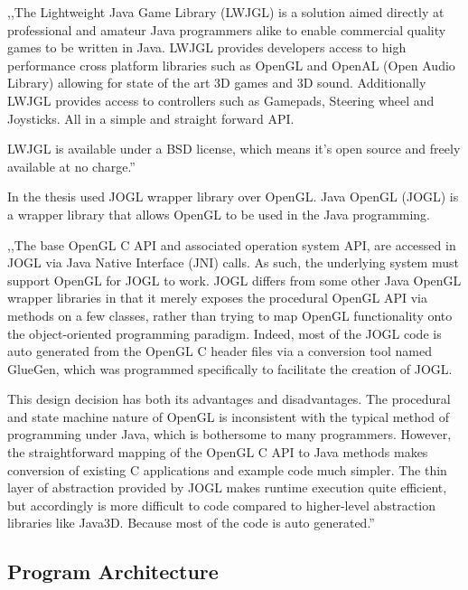 ,,The Lightweight Java Game Library (LWJGL) is a solution aimed directly at professional and amateur Java programmers alike to enable commercial quality games to be written in Java. LWJGL provides developers access to high performance cross platform libraries such as OpenGL and OpenAL (Open Audio Library) allowing for state of the art 3D games and 3D sound. Additionally LWJGL provides access to controllers such as Gamepads, Steering wheel and Joysticks. All in a simple and straight forward API.

LWJGL is available under a BSD license, which means it's open source and freely available at no charge.''~\cite{LWJGL}


In the thesis used JOGL wrapper library over OpenGL. Java OpenGL (JOGL) is a wrapper library that allows OpenGL to be used in the Java programming.


,,The base OpenGL C API and associated operation system API, are accessed in JOGL via Java Native Interface (JNI) calls. As such, the underlying system must support OpenGL for JOGL to work. JOGL differs from some other Java OpenGL wrapper libraries in that it merely exposes the procedural OpenGL API via methods on a few classes, rather than trying to map OpenGL functionality onto the object-oriented programming paradigm. Indeed, most of the JOGL code is auto generated from the OpenGL C header files via a conversion tool named GlueGen, which was programmed specifically to facilitate the creation of JOGL.


This design decision has both its advantages and disadvantages. The procedural and state machine nature of OpenGL is inconsistent with the typical method of programming under Java, which is bothersome to many programmers. However, the straightforward mapping of the OpenGL C API to Java methods makes conversion of existing C applications and example code much simpler. The thin layer of abstraction provided by JOGL makes runtime execution quite efficient, but accordingly is more difficult to code compared to higher-level abstraction libraries like Java3D. Because most of the code is auto generated.''~\cite{JOGL}


\subsection{Program Architecture}

